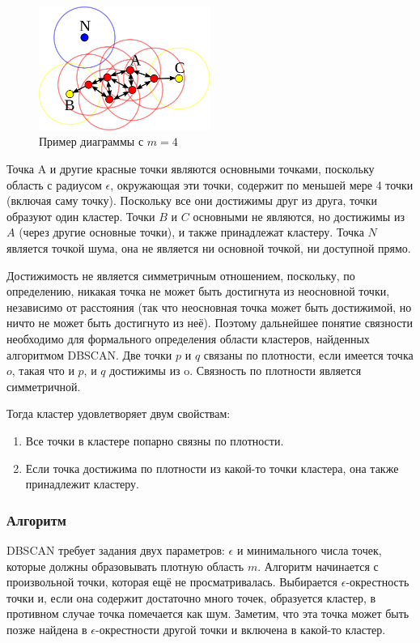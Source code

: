 \documentclass[bachelor, och, referat]{SCWorks}
\begin{document}
\begin{figure}[H]
    \centering
    \includegraphics[width=0.5\textwidth]{5.png}
    \caption{Пример диаграммы с $m = 4$}
\end{figure}

Точка A и другие красные точки являются основными точками, поскольку область с радиусом 
$\epsilon$, окружающая эти точки, содержит по меньшей мере 4 точки (включая саму точку). Поскольку все они достижимы друг из друга, точки образуют один кластер. Точки $B$ и $C$ основными не являются, но достижимы из $A$ (через другие основные точки), и также принадлежат кластеру. Точка $N$ является точкой шума, она не является ни основной точкой, ни доступной прямо.

Достижимость не является симметричным отношением, поскольку, по определению, никакая точка не может быть достигнута из неосновной точки, независимо от расстояния (так что неосновная точка может быть достижимой, но ничто не может быть достигнуто из неё). Поэтому дальнейшее понятие связности необходимо для формального определения области кластеров, найденных алгоритмом DBSCAN. Две точки $p$ и $q$ связаны по плотности, если имеется точка $o$, такая что и $p$, и $q$ достижимы из o. Связность по плотности является симметричной.

Тогда кластер удовлетворяет двум свойствам:
\begin{enumerate}
    \item Все точки в кластере попарно связны по плотности.
    \item Если точка достижима по плотности из какой-то точки кластера, она также принадлежит кластеру.
\end{enumerate}

\subsubsection{Алгоритм}
DBSCAN требует задания двух параметров: 
$\epsilon$ и минимального числа точек, которые должны образовывать плотную область $m$. Алгоритм начинается с произвольной точки, которая ещё не просматривалась. Выбирается 
$\epsilon$-окрестность точки и, если она содержит достаточно много точек, образуется кластер, в противном случае точка помечается как шум. Заметим, что эта точка может быть позже найдена в 
$\epsilon$-окрестности другой точки и включена в какой-то кластер.
\end{document}
